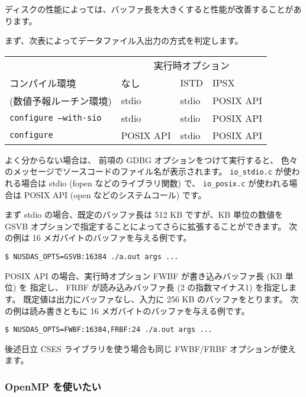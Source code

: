 ディスクの性能によっては、バッファ長を大きくすると性能が改善することがあります。

まず、次表によってデータファイル入出力の方式を判定します。

\begin{center}
\begin{tabular}{l|lll}
\hline
			& \multicolumn{3}{c}{実行時オプション} \\
コンパイル環境		& なし		& ISTD	& IPSX \\
\hline
(数値予報ルーチン環境)	& stdio		& stdio	& POSIX API \\
{\tt configure --with-sio} & stdio	& stdio	& POSIX API \\
{\tt configure}		& POSIX API	& stdio	& POSIX API \\
\hline
\end{tabular}
\end{center}

よく分からない場合は、
前項の GDBG オプションをつけて実行すると、
色々のメッセージでソースコードのファイル名が表示されます。
\verb|io_stdio.c| が使われる場合は stdio (fopen などのライブラリ関数) で、
\verb|io_posix.c| が使われる場合は POSIX API (open などのシステムコール) です。

まず stdio の場合、既定のバッファ長は 512 KB ですが、KB 単位の数値を
GSVB オプションで指定することによってさらに拡張することができます。
次の例は 16 メガバイトのバッファを与える例です。

\begin{screen}
\begin{verbatim}
$ NUSDAS_OPTS=GSVB:16384 ./a.out args ...
\end{verbatim}
\end{screen}

POSIX API の場合、実行時オプション FWBF が書き込みバッファ長 (KB 単位) を
指定し、 FRBF が読み込みバッファ長 (2 の指数マイナス1) を指定します。
既定値は出力にバッファなし、入力に 256 KB のバッファをとります。
次の例は読み書きともに 16 メガバイトのバッファを与える例です。

\begin{screen}
\begin{verbatim}
$ NUSDAS_OPTS=FWBF:16384,FRBF:24 ./a.out args ...
\end{verbatim}
\end{screen}

後述日立 CSES ライブラリを使う場合も同じ FWBF/FRBF オプションが使えます。

\subsubsection{OpenMP を使いたい}

